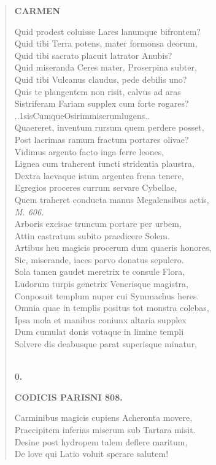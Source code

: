 \documentclass[11pt, a4paper]{report}
\begin{document}
\begin{verse}
    \begin{center} \textbf{CARMEN} \end{center} \marginpar{[24]} Quid prodest coluisse Lares lanumque bifrontem? \\ Quid tibi Terra potens, mater formonsa deorum, \\ Quid tibi sacrato placuit latrator Anubis? \\ Quid miseranda Ceres mater, Proserpina subter, \\ Quid tibi Vulcanus claudus, pede debilis uno? \\ Quis te plangentem non risit, calvus ad aras \\ Sistriferam Fariam supplex cum forte rogares? \\ ..1sisCumqueOsirimmiserumlugens.. \\ Quaereret, inventum rursum quem perdere posset, \\ Post lacrimas ramum fractum portares olivae? \\ Vidimus argento facto inga ferre leones, \\ Lignea cum traherent iuncti stridentia plaustra, \\ Dextra laevaque istum argentea frena tenere, \\ Egregios proceres currum servare Cybellae, \\ Quem traheret conducta manus Megalensibus actis, \\ \textit{M. 606.} \\ Arboris excisae truncum portare per urbem, \\ Attin castratum subito praedicere Solem. \\ Artibus heu magicis procerum dum quaeris honores, \\ Sic, miserande, iaces parvo donatus sepulcro. \\ Sola tamen gaudet meretrix te consule Flora, \\ Ludorum turpis genetrix Venerisque magistra, \\ Conposuit templum nuper cui Symmachus heres. \\ Omnia quae in templis positus tot monstra colebas, \\ Ipsa mola et manibus coniunx altaria supplex \\ Dum cumulat donis votaque in limine templi \\ Solvere dis deabusque parat superisque minatur, \\ 
        ﻿\pagebreak 
    \begin{center} \textbf{0.} \end{center}\begin{center} \textbf{CODICIS PARISNI 808.} \end{center}Carminibus magicis cupiens Acheronta movere, \\ Praecipitem inferias miserum sub Tartara misit. \\ Desine post hydropem talem deflere maritum, \\ De love qui Latio voluit sperare salutem! \\ 
      \end{verse}
  
\end{document}
